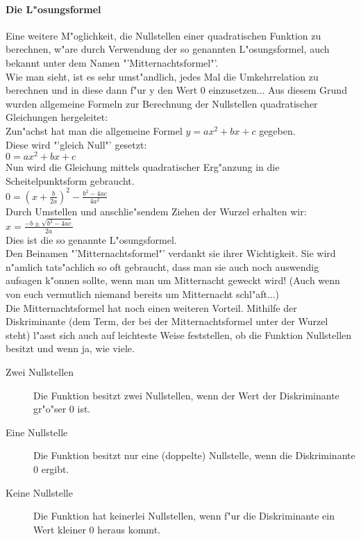 \paragraph{Die L"osungsformel}\hspace{12 cm}
Eine weitere M"oglichkeit, die Nullstellen einer quadratischen Funktion zu berechnen, w"are durch Verwendung der so genannten L"osungsformel, auch bekannt unter dem Namen "'Mitternachtsformel"'.\vspace{0.5 cm} \\
Wie man sieht, ist es sehr umst"andlich, jedes Mal die Umkehrrelation zu berechnen und in diese dann f"ur y den Wert 0 einzusetzen... Aus diesem Grund wurden allgemeine Formeln zur Berechnung der Nullstellen quadratischer Gleichungen hergeleitet:\\
Zun"achst hat man die allgemeine Formel $y = ax^2 + bx +c$ gegeben.\\
Diese wird "'gleich Null"' gesetzt:\\
$0 = ax^2 + bx + c$\\
Nun wird die Gleichung mittels quadratischer Erg"anzung in die Scheitelpunktsform gebraucht.\\
$0 = (x + \frac{b}{2a})^2 - \frac{b^2-4ac}{4a^2}$\\
Durch Umstellen und anschlie"sendem Ziehen der Wurzel erhalten wir:\\
$x = \frac{-b \pm \sqrt{b^2 - 4ac}}{2a}$\\
Dies ist die so genannte L"osungsformel.\\
Den Beinamen "'Mitternachtsformel"' verdankt sie ihrer Wichtigkeit. Sie wird n"amlich tats"achlich so oft gebraucht, dass man sie auch noch auswendig aufsagen k"onnen sollte, wenn man um Mitternacht geweckt wird! (Auch wenn von euch vermutlich niemand bereits um Mitternacht schl"aft...)\vspace{0.5 cm}\\
Die Mitternachtsformel hat noch einen weiteren Vorteil. Mithilfe der Diskriminante (dem Term, der bei der Mitternachtsformel unter der Wurzel steht) l"asst sich auch auf leichteste Weise feststellen, ob die Funktion Nullstellen besitzt und wenn ja, wie viele.
\begin{description}
\item[Zwei Nullstellen] Die Funktion besitzt zwei Nullstellen, wenn der Wert der Diskriminante gr"o"ser 0 ist.
\item[Eine Nullstelle] Die Funktion besitzt nur eine (doppelte) Nullstelle, wenn die Diskriminante 0 ergibt.
\item[Keine Nullstelle] Die Funktion hat keinerlei Nullstellen, wenn f"ur die Diskriminante ein Wert kleiner 0 heraus kommt.
\end{description}